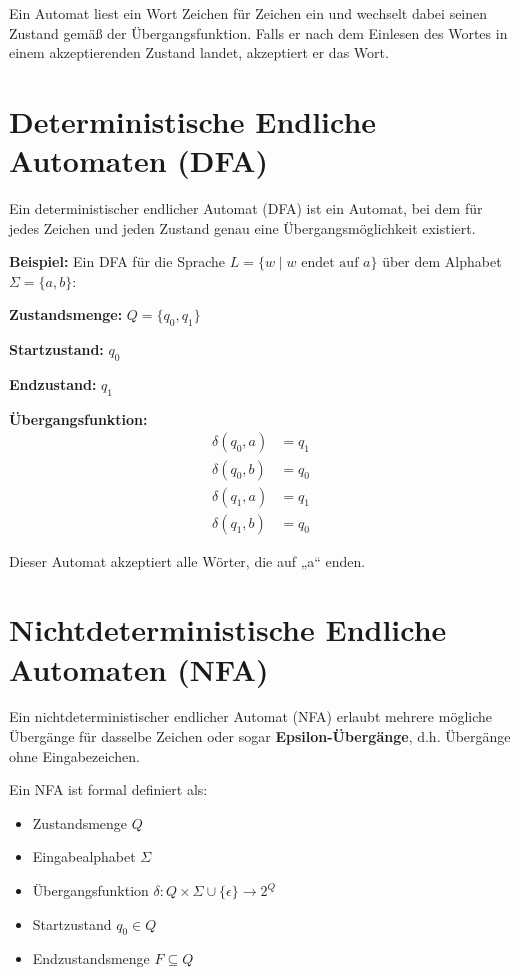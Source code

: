 \documentclass[a4paper,12pt]{article}
\begin{document}
	Ein Automat liest ein Wort Zeichen für Zeichen ein und wechselt dabei seinen Zustand gemäß der Übergangsfunktion. Falls er nach dem Einlesen des Wortes in einem akzeptierenden Zustand landet, akzeptiert er das Wort.
	
	\section{Deterministische Endliche Automaten (DFA)}
	
	Ein deterministischer endlicher Automat (DFA) ist ein Automat, bei dem für jedes Zeichen und jeden Zustand genau eine Übergangsmöglichkeit existiert.
	
	\textbf{Beispiel:} Ein DFA für die Sprache $L = \{ w \mid w \text{ endet auf } a \}$ über dem Alphabet $\Sigma = \{a, b\}$:
	
	\begin{center}
	\end{center}
	
	\textbf{Zustandsmenge:} $Q = \{q_0, q_1\}$
	
	\textbf{Startzustand:} $q_0$
	
	\textbf{Endzustand:} $q_1$
	
	\textbf{Übergangsfunktion:}
	\begin{align*}
		\delta(q_0, a) &= q_1 \\
		\delta(q_0, b) &= q_0 \\
		\delta(q_1, a) &= q_1 \\
		\delta(q_1, b) &= q_0
	\end{align*}
	
	Dieser Automat akzeptiert alle Wörter, die auf „a“ enden.
	
	\section{Nichtdeterministische Endliche Automaten (NFA)}
	
	Ein nichtdeterministischer endlicher Automat (NFA) erlaubt mehrere mögliche Übergänge für dasselbe Zeichen oder sogar \textbf{Epsilon-Übergänge}, d.h. Übergänge ohne Eingabezeichen.
	
	Ein NFA ist formal definiert als:
	\begin{itemize}
		\item Zustandsmenge $Q$
		\item Eingabealphabet $\Sigma$
		\item Übergangsfunktion $\delta: Q \times \Sigma \cup \{\epsilon\} \to 2^Q$
		\item Startzustand $q_0 \in Q$
		\item Endzustandsmenge $F \subseteq Q$
	\end{itemize}
	
\end{document}
